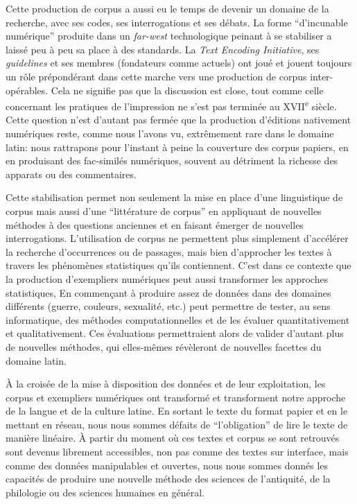 Cette production de corpus a aussi eu le temps de devenir un domaine de la recherche, avec ses codes, ses interrogations et ses débats. La forme \enquote{d'incunable numérique} produite dans un \textit{far-west} technologique peinant à se stabiliser a laissé peu à peu sa place à des standards. La \textit{Text Encoding Initiative}, ses \textit{guidelines} et ses membres (fondateurs comme actuels) ont joué et jouent toujours un rôle prépondérant dans cette marche vers une production de corpus inter-opérables. Cela ne signifie pas que la discussion est close, tout comme celle concernant les pratiques de l'impression ne s'est pas terminée au XVII\textsuperscript{e} siècle. Cette question n'est d'autant pas fermée que la production d'éditions nativement numériques reste, comme nous l'avons vu, extrêmement rare dans le domaine latin: nous rattrapons pour l'instant à peine la couverture des corpus papiers, en en produisant des fac-similés numériques, souvent au détriment la richesse des apparats ou des commentaires.

Cette stabilisation permet non seulement la mise en place d'une linguistique de corpus mais aussi d'une \enquote{littérature de corpus} en appliquant de nouvelles méthodes à des questions anciennes et en faisant émerger de nouvelles interrogations. L'utilisation de corpus ne permettent plus simplement d'accélérer la recherche d'occurrences ou de passages, mais bien d'approcher les textes à travers les phénomènes statistiques qu'ils contiennent. C'est dans ce contexte que la production d'exempliers numériques peut aussi transformer les approches statistiques, En commençant à produire assez de données dans des domaines différents (guerre, couleurs, sexualité, etc.) peut permettre de tester, au sens informatique, des méthodes computationnelles et de les évaluer quantitativement et qualitativement. Ces évaluations permettraient alors de valider d'autant plus de nouvelles méthodes, qui elles-mêmes révèleront de nouvelles facettes du domaine latin.

À la croisée de la mise à disposition des données et de leur exploitation, les corpus et exempliers numériques ont transformé et transforment notre approche de la langue et de la culture latine. En sortant le texte du format papier et en le mettant en réseau, nous nous sommes défaits de \enquote{l'obligation} de lire le texte de manière linéaire. À partir du moment où ces textes et corpus se sont retrouvés sont devenus librement accessibles, non pas comme des textes sur interface, mais comme des données manipulables et ouvertes, nous nous sommes donnés les capacités de produire une nouvelle méthode des sciences de l'antiquité, de la philologie ou des sciences humaines en général.


  